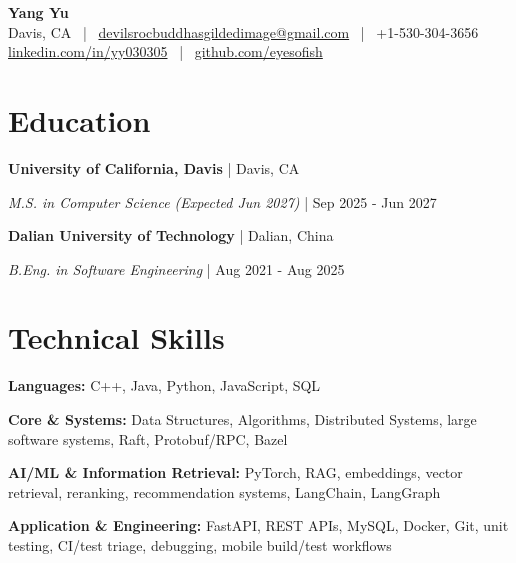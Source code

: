 \documentclass[letterpaper,10pt]{article}
\begin{document}
\begin{center}
  \textbf{\Large Yang Yu} \\
  \small Davis, CA ~|~ \href{mailto:devilsrocbuddhasgildedimage@gmail.com}{devilsrocbuddhasgildedimage@gmail.com} ~|~ +1-530-304-3656 \\
  \small \href{https://linkedin.com/in/yy030305}{linkedin.com/in/yy030305} ~|~ \href{https://github.com/eyesofish}{github.com/eyesofish}
\end{center}

\section{Education}
\noindent\textbf{University of California, Davis} | Davis, CA\par
\noindent\textit{M.S. in Computer Science (Expected Jun 2027)} | Sep 2025 - Jun 2027\par\vspace{2pt}
\noindent\textbf{Dalian University of Technology} | Dalian, China\par
\noindent\textit{B.Eng. in Software Engineering} | Aug 2021 - Aug 2025\par

\section{Technical Skills}
\resumeItemListStart
  \item \textbf{Languages:} C++, Java, Python, JavaScript, SQL
  \item \textbf{Core \& Systems:} Data Structures, Algorithms, Distributed Systems, large software systems, Raft, Protobuf/RPC, Bazel
  \item \textbf{AI/ML \& Information Retrieval:} PyTorch, RAG, embeddings, vector retrieval, reranking, recommendation systems, LangChain, LangGraph
  \item \textbf{Application \& Engineering:} FastAPI, REST APIs, MySQL, Docker, Git, unit testing, CI/test triage, debugging, mobile build/test workflows
\resumeItemListEnd
\end{document}
